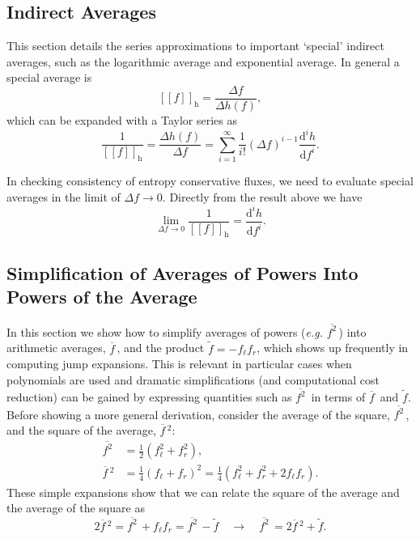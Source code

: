 \documentclass[10pt]{article}
\renewcommand{\j}[1]{\Delta #1}
\renewcommand{\d}{\mathrm{d}}
\newcommand{\avg}[1]{\overline{#1}\,}
\newcommand{\invavg}[1]{\widetilde{#1}}
\newcommand{\spavg}[2]{\left[\left[#1\right]\right]_{\mathrm{#2}}}
\begin{document}
\subsection{Indirect Averages}
This section details the series approximations to important `special' indirect averages, such as the logarithmic average and exponential average.
In general a special average is
\begin{equation}
	\spavg{f}{h} = \frac{\j{f}}{\j{h(f)}},
\end{equation}
which can be expanded with a Taylor series as
\begin{equation}
	\frac{1}{\spavg{f}{h}} = \frac{\j{h(f)}}{\j{f}} = \sum_{i=1}^{\infty}\frac{1}{i!}(\j{f})^{i-1}\frac{\d^{i}h}{\d f^{i}}.
\end{equation}

In checking consistency of entropy conservative fluxes, we need to evaluate special averages in the limit of $\j{f}\to0$.
Directly from the result above we have 
\begin{equation}
	\lim_{\j{f}\to0}\frac{1}{\spavg{f}{h}} = \frac{\d^{i}h}{\d f^{i}}.
\end{equation}


\subsection{Simplification of Averages of Powers Into Powers of the Average} \label{sec: avg powers}
In this section we show how to simplify averages of powers (\emph{e.g.} $\avg{f^2}$) into arithmetic averages, $\avg{f}$, and the product $\invavg{f} = -f_\ell f_r$, which shows up frequently in computing jump expansions.
This is relevant in particular cases when polynomials are used and dramatic simplifications (and computational cost reduction) can be gained by expressing quantities such as $\avg{f^2}$ in terms of $\avg{f}$ and $\invavg{f}$.
Before showing a more general derivation, consider the average of the square, $\avg{f^2}$, and the square of the average, $\avg{f}^2$:
\begin{equation}
	\begin{aligned}
		\avg{f^2} &= \frac{1}{2}(f_\ell^2 + f_r^2), \\
		\avg{f}^2 &= \frac{1}{4}(f_\ell + f_r)^2 = \frac{1}{4}(f_\ell^2 + f_r^2 + 2f_\ell f_r).
	\end{aligned}
\end{equation}
These simple expansions show that we can relate the square of the average and the average of the square as
\begin{equation}
	2\avg{f}^2 = \avg{f^2} + f_\ell f_r = \avg{f^2} - \invavg{f} \quad \rightarrow \quad \avg{f^2} = 2\avg{f}^2 + \invavg{f}.
\end{equation}
\end{document}

